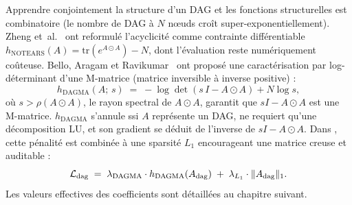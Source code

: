 Apprendre conjointement la structure d'un DAG et les fonctions structurelles est combinatoire (le nombre de DAG à $N$ nœuds croît super-exponentiellement). Zheng et~al.~\cite{zheng_notears_2018} ont reformulé l'acyclicité comme contrainte différentiable $h_{\mathrm{NOTEARS}}(A) = \mathrm{tr}(e^{A \odot A}) - N$, dont l'évaluation reste numériquement coûteuse. Bello, Aragam et Ravikumar~\cite{bello_dagma_2022} ont proposé une caractérisation par log-déterminant d'une M-matrice (matrice inversible à inverse positive) :
\begin{equation}
  h_{\mathrm{DAGMA}}(A;\, s) \;=\; -\log \det\!\left( s\,I - A \odot A \right) + N \log s,
  \label{eq:dagma}
\end{equation}
où $s > \rho(A \odot A)$, le rayon spectral de $A \odot A$, garantit que $sI - A \odot A$ est une M-matrice. $h_{\mathrm{DAGMA}}$ s'annule ssi $A$ représente un DAG, ne requiert qu'une décomposition LU, et son gradient se déduit de l'inverse de $sI - A \odot A$. Dans \Oracle{}, cette pénalité est combinée à une sparsité $L_1$ encourageant une matrice creuse et auditable :
\begin{equation}
  \mathcal{L}_{\mathrm{dag}} \;=\; \lambda_{\mathrm{DAGMA}} \cdot h_{\mathrm{DAGMA}}(A_{\mathrm{dag}}) \;+\; \lambda_{L_1} \cdot \|A_{\mathrm{dag}}\|_1.
  \label{eq:loss-dag}
\end{equation}
Les valeurs effectives des coefficients sont détaillées au chapitre suivant.

\label{sec:oracle-decoder}

